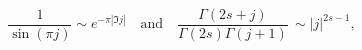 \begin{equation*}
\frac{1}{\sin(\pi j)}\sim e^{-\pi |\Im j|}
\quad\text{and}\quad
\frac{\Gamma(2s+j)}{\Gamma(2s)\Gamma(j+1)}\,\sim |j|^{2s-1},
\end{equation*}

